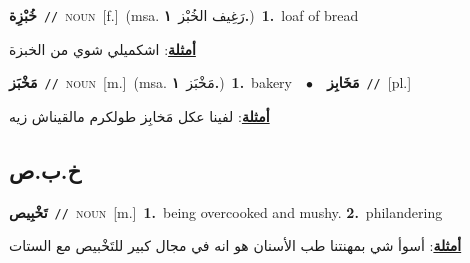 \documentclass[10pt,a4paper,twoside]{article} %
\begin{document}
\begin{multicols}{2}
{\setlength\topsep{0pt}\textbf{\foreignlanguage{arabic}{خُبْزِة}}\ {\color{gray}\texttt{//}\color{black}}\ \textsc{noun}\ [f.]\ \color{gray}(msa. \foreignlanguage{arabic}{رَغِيف الخُبْز}~\foreignlanguage{arabic}{\textbf{١.}})\color{black}\ \textbf{1.}~loaf of bread\  \begin{flushright}\color{gray}\foreignlanguage{arabic}{\textbf{\underline{\foreignlanguage{arabic}{أمثلة}}}: اشكميلي شوي من الخبزة}\end{flushright}\color{black}} \vspace{2mm}

{\setlength\topsep{0pt}\textbf{\foreignlanguage{arabic}{مَخْبَز}}\ {\color{gray}\texttt{//}\color{black}}\ \textsc{noun}\ [m.]\ \color{gray}(msa. \foreignlanguage{arabic}{مَخْبَز}~\foreignlanguage{arabic}{\textbf{١.}})\color{black}\ \textbf{1.}~bakery\ \ $\bullet$\ \ \setlength\topsep{0pt}\textbf{\foreignlanguage{arabic}{مَخَابِز}}\ {\color{gray}\texttt{//}\color{black}}\ [pl.]\  \begin{flushright}\color{gray}\foreignlanguage{arabic}{\textbf{\underline{\foreignlanguage{arabic}{أمثلة}}}: لفينا عكل مَخابِز طولكرم مالقيناش زيه}\end{flushright}\color{black}} \vspace{2mm}

\vspace{-3mm}
\subsection*{\color{blue}\foreignlanguage{arabic}{خ.ب.ص}\color{blue}{}} 

{\setlength\topsep{0pt}\textbf{\foreignlanguage{arabic}{تَخْبِيص}}\ {\color{gray}\texttt{//}\color{black}}\ \textsc{noun}\ [m.]\ \textbf{1.}~being overcooked and mushy.  \textbf{2.}~philandering\  \begin{flushright}\color{gray}\foreignlanguage{arabic}{\textbf{\underline{\foreignlanguage{arabic}{أمثلة}}}: أسوأ شي بمهنتنا طب الأسنان هو انه في مجال كبير للتَخْبيص مع الستات}\end{flushright}\color{black}} \vspace{2mm}


\end{multicols}
\end{document}
